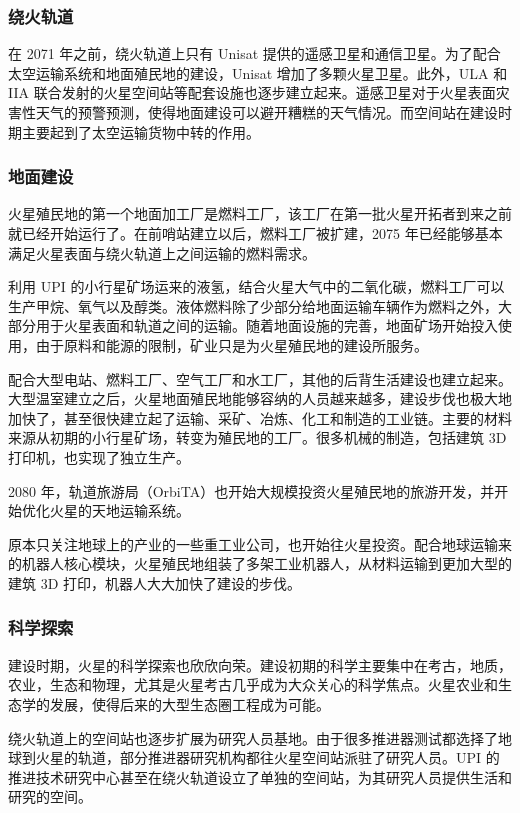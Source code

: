 \documentclass[letterpaper,10pt]{sphinxmanual}
\begin{document}
\subsubsection{绕火轨道}
\label{history:id26}
在 2071 年之前，绕火轨道上只有 Unisat 提供的遥感卫星和通信卫星。为了配合太空运输系统和地面殖民地的建设，Unisat 增加了多颗火星卫星。此外，ULA 和 IIA 联合发射的火星空间站等配套设施也逐步建立起来。遥感卫星对于火星表面灾害性天气的预警预测，使得地面建设可以避开糟糕的天气情况。而空间站在建设时期主要起到了太空运输货物中转的作用。


\subsubsection{地面建设}
\label{history:id27}
火星殖民地的第一个地面加工厂是燃料工厂，该工厂在第一批火星开拓者到来之前就已经开始运行了。在前哨站建立以后，燃料工厂被扩建，2075 年已经能够基本满足火星表面与绕火轨道上之间运输的燃料需求。

利用 UPI 的小行星矿场运来的液氢，结合火星大气中的二氧化碳，燃料工厂可以生产甲烷、氧气以及醇类。液体燃料除了少部分给地面运输车辆作为燃料之外，大部分用于火星表面和轨道之间的运输。随着地面设施的完善，地面矿场开始投入使用，由于原料和能源的限制，矿业只是为火星殖民地的建设所服务。

配合大型电站、燃料工厂、空气工厂和水工厂，其他的后背生活建设也建立起来。大型温室建立之后，火星地面殖民地能够容纳的人员越来越多，建设步伐也极大地加快了，甚至很快建立起了运输、采矿、冶炼、化工和制造的工业链。主要的材料来源从初期的小行星矿场，转变为殖民地的工厂。很多机械的制造，包括建筑 3D 打印机，也实现了独立生产。

2080 年，轨道旅游局（OrbiTA）也开始大规模投资火星殖民地的旅游开发，并开始优化火星的天地运输系统。

原本只关注地球上的产业的一些重工业公司，也开始往火星投资。配合地球运输来的机器人核心模块，火星殖民地组装了多架工业机器人，从材料运输到更加大型的建筑 3D 打印，机器人大大加快了建设的步伐。


\subsubsection{科学探索}
\label{history:id28}
建设时期，火星的科学探索也欣欣向荣。建设初期的科学主要集中在考古，地质，农业，生态和物理，尤其是火星考古几乎成为大众关心的科学焦点。火星农业和生态学的发展，使得后来的大型生态圈工程成为可能。

绕火轨道上的空间站也逐步扩展为研究人员基地。由于很多推进器测试都选择了地球到火星的轨道，部分推进器研究机构都往火星空间站派驻了研究人员。UPI 的推进技术研究中心甚至在绕火轨道设立了单独的空间站，为其研究人员提供生活和研究的空间。
\end{document}
